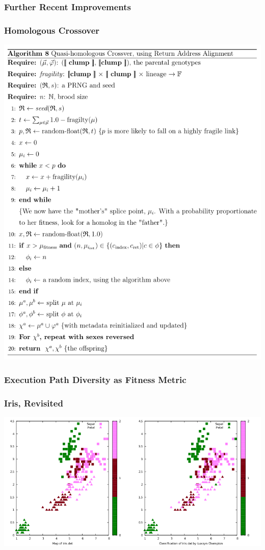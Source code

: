 \documentclass[11pt]{article}
\begin{document}
\subsubsection*{Further Recent Improvements}
\label{sec:orga176560}

\subsubsection*{Homologous Crossover}
\label{sec:org65967cd}
\begin{center}
\includegraphics[width=.9\linewidth]{../images/homologous-crossover.png}
\end{center}

\subsubsection*{Execution Path Diversity as Fitness Metric}
\label{sec:org567ca88}

\subsubsection*{Iris, Revisited}
\label{sec:org92e793b}
\begin{center}
\includegraphics[width=.9\linewidth]{../images/plots/iris_with_luxxyn.png}
\end{center}
\end{document}
